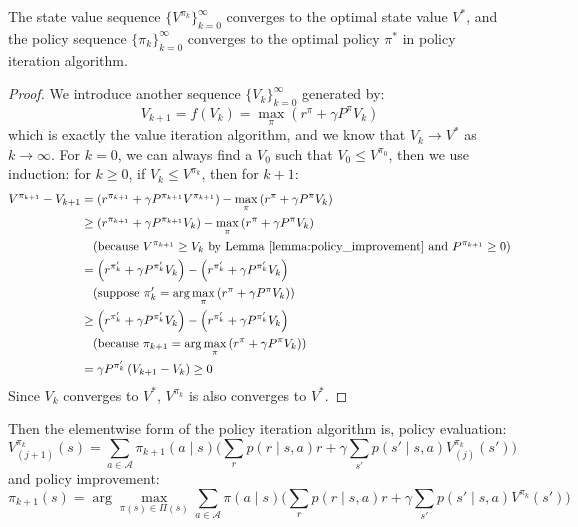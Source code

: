 \documentclass[10pt]{elegantbook}
\begin{document}
\begin{theorem}
    The state value sequence $\{ V^{\pi_k} \}_{k=0}^{\infty}$ converges to the optimal state value $V^*$, and the policy sequence $\{ \pi_k \}_{k=0}^{\infty}$ 
    converges to the optimal policy $\pi^*$ in policy iteration algorithm.
\end{theorem}
\begin{proof}
    We introduce another sequence $\{ V_{k} \}_{k=0}^{\infty}$ generated by:
    \[ V_{k+1} = f(V_k) = \max_{\pi} (r^{\pi} + \gamma P^{\pi} V_k) \]
    which is exactly the value iteration algorithm, and we know that $V_k \rightarrow V^*$ as $k \rightarrow \infty$.
    For $k = 0$, we can always find a $V_0$ such that $V_0 \leq V^{\pi_0}$, then we use induction: for $k \geq 0$, if $V_k \leq V^{\pi_k}$, then for $k+1$:
    \begin{align*}
        V^{\pi_{k+1}} - V_{k+1} 
        &= \left(r^{\pi_{k+1}} + \gamma P^{\pi_{k+1}} V^{\pi_{k+1}}\right) - \max_{\pi} \left(r^{\pi} + \gamma P^{\pi} V_k\right) \\
        &\geq \left(r^{\pi_{k+1}} + \gamma P^{\pi_{k+1}} V_k\right) - \max_{\pi} \left(r^{\pi} + \gamma P^{\pi} V_k\right) \\
        &\quad \text{(because } V^{\pi_{k+1}} \geq V_k \text{ by Lemma \ref{lemma:policy_improvement} and } P^{\pi_{k+1}} \geq 0 \text{)} \\
        &= \left(r^{\pi_k'} + \gamma P^{\pi_k'} V_k\right) - \left(r^{\pi_k'} + \gamma P^{\pi_k'} V_k\right) \\
        &\quad \text{(suppose } \pi_k' = \arg\max_{\pi} \left(r^{\pi} + \gamma P^{\pi} V_k\right)) \\
        &\geq \left(r^{\pi_k'} + \gamma P^{\pi_k'} V_k\right) - \left(r^{\pi_k'} + \gamma P^{\pi_k'} V_k\right) \\
        &\quad \text{(because } \pi_{k+1} = \arg\max_{\pi} \left(r^{\pi} + \gamma P^{\pi} V_k\right)) \\
        &= \gamma P^{\pi_k'} \left(V_{k+1} - V_k\right) \geq 0 \\
    \end{align*}
    Since $V_k$ converges to $V^*$, $V^{\pi_k}$ is also converges to $V^*$.
\end{proof}

Then the elementwise form of the policy iteration algorithm is, policy evaluation:
\[ V^{\pi_k}_{(j+1)}(s) = \sum_{a \in \mathcal A}\pi_{k+1}(a\mid s) \big ( \sum_r p(r \mid s, a) r + \gamma \sum_{s'}p(s' \mid s, a)V^{\pi_k}_{(j)}(s') \big ) \]
and policy improvement:
\[ \pi_{k+1}(s) = \arg\max_{\pi(s) \in \Pi(s)} \sum_{a \in \mathcal A}\pi(a\mid s) \big ( \sum_r p(r \mid s, a) r + \gamma \sum_{s'}p(s' \mid s, a)V^{\pi_k}(s') \big ) \]
\end{document}
